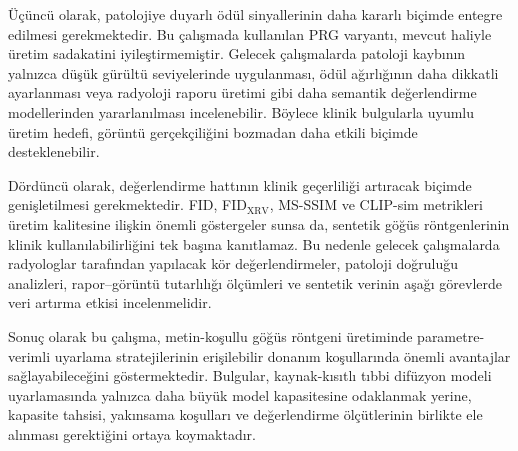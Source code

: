\documentclass[11pt]{article}
\begin{document}
Üçüncü olarak, patolojiye duyarlı ödül sinyallerinin daha kararlı biçimde
entegre edilmesi gerekmektedir. Bu çalışmada kullanılan PRG varyantı, mevcut
haliyle üretim sadakatini iyileştirmemiştir. Gelecek çalışmalarda patoloji
kaybının yalnızca düşük gürültü seviyelerinde uygulanması, ödül ağırlığının
daha dikkatli ayarlanması veya radyoloji raporu üretimi gibi daha semantik
değerlendirme modellerinden yararlanılması incelenebilir. Böylece klinik
bulgularla uyumlu üretim hedefi, görüntü gerçekçiliğini bozmadan daha etkili
biçimde desteklenebilir.

Dördüncü olarak, değerlendirme hattının klinik geçerliliği artıracak biçimde
genişletilmesi gerekmektedir. FID, FID$_{\text{XRV}}$, MS-SSIM ve CLIP-sim
metrikleri üretim kalitesine ilişkin önemli göstergeler sunsa da, sentetik
göğüs röntgenlerinin klinik kullanılabilirliğini tek başına kanıtlamaz. Bu
nedenle gelecek çalışmalarda radyologlar tarafından yapılacak kör
değerlendirmeler, patoloji doğruluğu analizleri, rapor--görüntü tutarlılığı
ölçümleri ve sentetik verinin aşağı görevlerde veri artırma etkisi
incelenmelidir.

Sonuç olarak bu çalışma, metin-koşullu göğüs röntgeni üretiminde
parametre-verimli uyarlama stratejilerinin erişilebilir donanım koşullarında
önemli avantajlar sağlayabileceğini göstermektedir. Bulgular, kaynak-kısıtlı
tıbbi difüzyon modeli uyarlamasında yalnızca daha büyük model kapasitesine
odaklanmak yerine, kapasite tahsisi, yakınsama koşulları ve değerlendirme
ölçütlerinin birlikte ele alınması gerektiğini ortaya koymaktadır.
\end{document}
